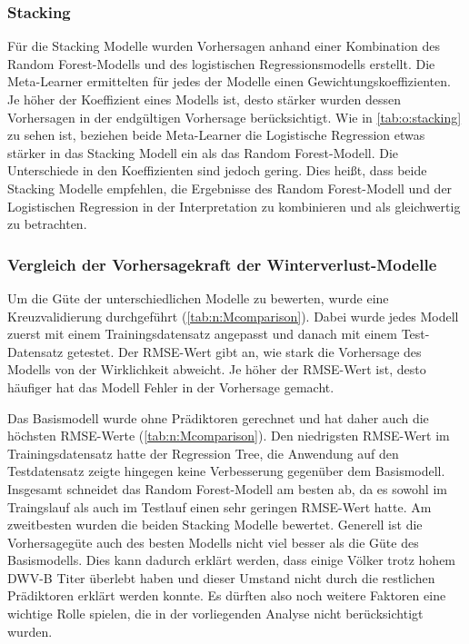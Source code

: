  
\subsubsection{Stacking}

Für die Stacking Modelle wurden Vorhersagen anhand einer Kombination des Random Forest-Modells und des logistischen Regressionsmodells erstellt. Die Meta-Learner ermittelten für jedes der Modelle einen Gewichtungskoeffizienten. Je höher der Koeffizient eines Modells ist, desto stärker wurden dessen Vorhersagen in der endgültigen Vorhersage berücksichtigt. Wie in \cref{tab:o:stacking} zu sehen ist, beziehen beide Meta-Learner die Logistische Regression etwas stärker in das Stacking Modell ein als das Random Forest-Modell. Die Unterschiede in den Koeffizienten sind jedoch gering. Dies heißt, dass beide Stacking Modelle empfehlen, die Ergebnisse des Random Forest-Modell und der Logistischen Regression in der Interpretation zu kombinieren und als gleichwertig zu betrachten.



 
\subsubsection{Vergleich der Vorhersagekraft der Winterverlust-Modelle} \label{chap:vorhersage.modelle}
 
 Um die Güte der unterschiedlichen Modelle zu bewerten, wurde eine Kreuzvalidierung durchgeführt (\cref{tab:n:Mcomparison}). Dabei wurde jedes Modell zuerst mit einem Trainingsdatensatz angepasst und danach mit einem Test-Datensatz getestet. Der RMSE-Wert gibt an, wie stark die Vorhersage des Modells von der Wirklichkeit abweicht. Je höher der RMSE-Wert ist, desto häufiger hat das Modell Fehler in der Vorhersage gemacht.
 
 Das Basismodell wurde ohne Prädiktoren gerechnet und hat daher auch die höchsten RMSE-Werte (\cref{tab:n:Mcomparison}). Den niedrigsten RMSE-Wert im Trainingsdatensatz hatte der Regression Tree, die Anwendung auf den Testdatensatz zeigte hingegen keine Verbesserung gegenüber dem Basismodell. Insgesamt schneidet das Random Forest-Modell am besten ab, da es sowohl im Traingslauf als auch im Testlauf einen sehr geringen RMSE-Wert hatte. Am zweitbesten wurden die beiden Stacking Modelle bewertet. Generell ist die Vorhersagegüte auch des besten Modells nicht viel besser als die Güte des Basismodells. Dies kann dadurch erklärt werden, dass einige Völker trotz hohem DWV-B Titer überlebt haben und dieser Umstand nicht durch die restlichen Prädiktoren erklärt werden konnte. Es dürften also noch weitere Faktoren eine wichtige Rolle spielen, die in der vorliegenden Analyse nicht berücksichtigt wurden.
 
